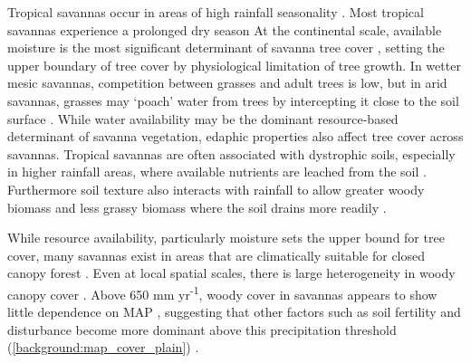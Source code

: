 \begin{refsection}
Tropical savannas occur in areas of high rainfall seasonality \citep{Lehmann2011}. Most tropical savannas experience a prolonged dry season At the continental scale, available moisture is the most significant determinant of savanna tree cover \citep{Sankaran2005}, setting the upper boundary of tree cover by physiological limitation of tree growth. In wetter mesic savannas, competition between grasses and adult trees is low, but in arid savannas, grasses may `poach' water from trees by intercepting it close to the soil surface \citep{Scheiter2007}. While water availability may be the dominant resource-based determinant of savanna vegetation, edaphic properties also affect tree cover across savannas. Tropical savannas are often associated with dystrophic soils, especially in higher rainfall areas, where available nutrients are leached from the soil \citep{February2013}. Furthermore soil texture also interacts with rainfall to allow greater woody biomass and less grassy biomass where the soil drains more readily \citep{Staver2011}. 

While resource availability, particularly moisture sets the upper bound for tree cover, many savannas exist in areas that are climatically suitable for closed canopy forest \citep{Sankaran2005, Lehmann2011, Staver2011, Murphy2012}. Even at local spatial scales, there is large heterogeneity in woody canopy cover \citep{Dantas2015}. Above \textapprox{}650 mm yr\textsuperscript{-1}, woody cover in savannas appears to show little dependence on MAP \citep{Sankaran2008, Sankaran2005, Good2011}, suggesting that other factors such as soil fertility and disturbance become more dominant above this precipitation threshold (\autoref{background:map_cover_plain}) \citep{Staver2011}. 


\end{refsection}
